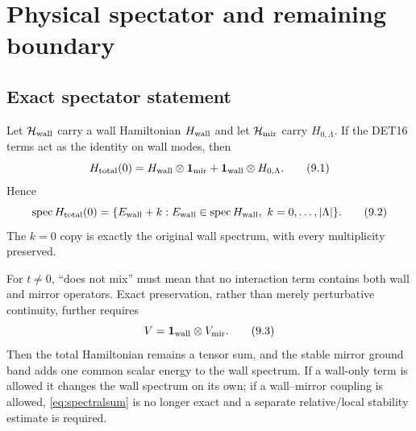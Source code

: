 \documentclass[11pt]{article}
\theoremstyle{remark}
\newcommand{\Hh}{\mathcal H}
\newcommand{\id}{\mathbf 1}
\begin{document}
\section{Physical spectator and remaining boundary}
\label{sec:boundary}

\subsection{Exact spectator statement}

Let $\Hh_{\rm wall}$ carry a wall Hamiltonian $H_{\rm wall}$ and let
$\Hh_{\rm mir}$ carry $H_{0,\Lambda}$.  If the DET16 terms act as the
identity on wall modes, then
\[
 H_{\rm total}(0)
 =H_{\rm wall}\otimes\id_{\rm mir}
 +\id_{\rm wall}\otimes H_{0,\Lambda}.
\tag{9.1}\label{eq:spectator}
\]
Hence
\[
 \operatorname{spec}H_{\rm total}(0)
 =\{E_{\rm wall}+k:
 E_{\rm wall}\in\operatorname{spec}H_{\rm wall},\
 k=0,\ldots,|\Lambda|\}.
\tag{9.2}\label{eq:spectralsum}
\]
The $k=0$ copy is exactly the original wall spectrum, with every
multiplicity preserved.

For $t\ne0$, ``does not mix'' must mean that no interaction term
contains both wall and mirror operators.  Exact preservation, rather
than merely perturbative continuity, further requires
\[
 V=\id_{\rm wall}\otimes V_{\rm mir}.
\tag{9.3}\label{eq:nomix}
\]
Then the total Hamiltonian remains a tensor sum, and the stable mirror
ground band adds one common scalar energy to the wall spectrum.  If a
wall-only term is allowed it changes the wall spectrum on its own; if a
wall--mirror coupling is allowed, \eqref{eq:spectralsum} is no longer
exact and a separate relative/local stability estimate is required.
\end{document}
